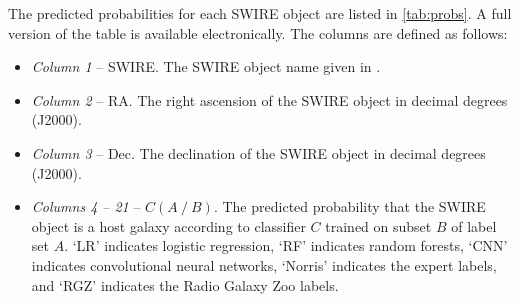 \documentclass[fleqn,usenatbib,usedcolumn]{mnras}
\begin{document}
  The predicted probabilities for each SWIRE object are listed in \autoref{tab:probs}. A full version of the table is available electronically.  The columns are defined as follows:
  \begin{itemize}
    \item {\em Column 1}  -- SWIRE. The SWIRE object name given in \citet{surace05swire}.
    \item {\em Column 2} -- RA. The right ascension of the SWIRE object in decimal degrees (J2000).
    \item {\em Column 3} -- Dec. The declination of the SWIRE object in decimal degrees (J2000).
    \item {\em Columns 4 -- 21} -- $C(A\ /\ B)$. The predicted probability
      that the SWIRE object is a host galaxy according to classifier $C$ trained
      on subset $B$ of label set $A$. `LR' indicates logistic regression, `RF'
      indicates random forests, `CNN' indicates convolutional neural networks,
      `Norris' indicates the expert labels, and `RGZ' indicates the Radio Galaxy
      Zoo labels.
  \end{itemize}
\end{document}
